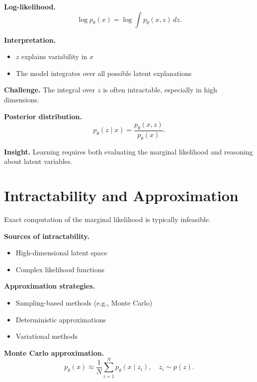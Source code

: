 \medskip

\noindent
\textbf{Log-likelihood.}
\[
\log p_\theta(x) = \log \int p_\theta(x, z) \, dz.
\]

\medskip

\noindent
\textbf{Interpretation.}
\begin{itemize}
    \item $z$ explains variability in $x$
    \item The model integrates over all possible latent explanations
\end{itemize}

\medskip

\noindent
\textbf{Challenge.}  
The integral over $z$ is often intractable, especially in high dimensions.

\medskip

\noindent
\textbf{Posterior distribution.}
\[
p_\theta(z \mid x) = \frac{p_\theta(x, z)}{p_\theta(x)}.
\]

\medskip

\noindent
\textbf{Insight.}  
Learning requires both evaluating the marginal likelihood and reasoning about latent variables.

\section{Intractability and Approximation}

Exact computation of the marginal likelihood is typically infeasible.

\medskip

\noindent
\textbf{Sources of intractability.}
\begin{itemize}
    \item High-dimensional latent space
    \item Complex likelihood functions
\end{itemize}

\medskip

\noindent
\textbf{Approximation strategies.}
\begin{itemize}
    \item Sampling-based methods (e.g., Monte Carlo)
    \item Deterministic approximations
    \item Variational methods
\end{itemize}

\medskip

\noindent
\textbf{Monte Carlo approximation.}
\[
p_\theta(x) \approx \frac{1}{N} \sum_{i=1}^N p_\theta(x \mid z_i), \quad z_i \sim p(z).
\]

